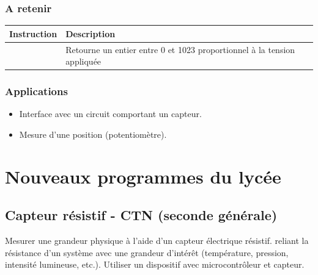 \documentclass[a4paper,10pt,french]{book}
\begin{document}
\subsection{A retenir}
\label{\detokenize{3_bases/5_can_tension:a-retenir}}

\begin{savenotes}\sphinxattablestart
\centering
\begin{tabulary}{\linewidth}[t]{|T|T|}
\hline
\sphinxstyletheadfamily 
Instruction
&\sphinxstyletheadfamily 
Description
\\
\hline
{}
&
Retourne un entier entre 0 et 1023 proportionnel à la tension appliquée
\\
\hline
\end{tabulary}
\par
\sphinxattableend\end{savenotes}


\subsection{Applications}
\label{\detokenize{3_bases/5_can_tension:applications}}\begin{itemize}
\item {} 
Interface avec un circuit comportant un capteur.

\item {} 
Mesure d’une position (potentiomètre).

\end{itemize}


\chapter{Nouveaux programmes du lycée}
\label{\detokenize{4_lycee/index:nouveaux-programmes-du-lycee}}\label{\detokenize{4_lycee/index::doc}}

\section{Capteur résistif - CTN (seconde générale)}
\label{\detokenize{4_lycee/1_seconde_ctn:capteur-resistif-ctn-seconde-generale}}\label{\detokenize{4_lycee/1_seconde_ctn::doc}}
\begin{sphinxShadowBox}

Mesurer une grandeur physique à l’aide d’un capteur électrique résistif.  reliant la résistance d’un système avec une grandeur d’intérêt (température, pression, intensité lumineuse, etc.).
Utiliser un dispositif avec microcontrôleur et capteur.
\end{sphinxShadowBox}
\end{document}
